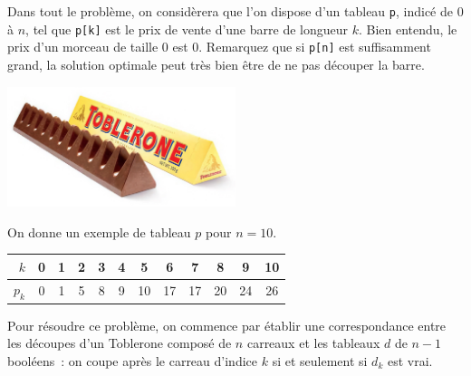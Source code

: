 \documentclass{magnoliaold}
\begin{document}
Dans tout le problème, on considèrera que l'on dispose d'un tableau
\verb!p!, indicé de $0$ à $n$, tel que \verb!p[k]! est le prix de
vente d'une barre de longueur $k$. Bien entendu, le prix d'un morceau de taille 0
est 0. Remarquez que si \verb!p[n]! est suffisamment grand, la solution optimale peut
très bien être de ne pas découper la barre.

\begin{center}
\includegraphics[width=0.5\textwidth]{../../commun/images/python-exos-toblerone}
\end{center}

\noindent On donne un exemple de tableau $p$ pour $n = 10$.
\begin{center}
  \begin{tabular}{r *{11}{c}}
    \toprule
    $k$   & 0 & 1 & 2 & 3 & 4 & 5 & 6 & 7 & 8 & 9 & 10\\
    \midrule
    ${p_k}$ & 0 & 1 & 5 & 8 & 9 & 10& 17& 17 & 20& 24& 26 \\
    \bottomrule
  \end{tabular}
\end{center}

Pour résoudre ce problème, on commence par établir une correspondance entre
les découpes d'un Toblerone composé de $n$ carreaux et les tableaux $d$
de $n-1$ booléens~: on coupe après le carreau d'indice $k$ si et seulement si
$d_k$ est vrai.
\end{document}
